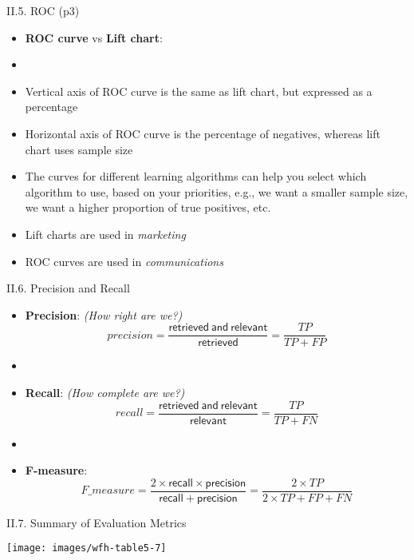 \documentclass[handout]{beamer}
\newcommand{\stronger}[1]{\textbf{\color{purple} #1}}
\begin{document}
\begin{frame}{II.5. ROC (p3)}
\begin{itemize}
\item \stronger{ROC curve} vs \stronger{Lift chart}:
\item[]
\item Vertical axis of ROC curve is the same as lift chart, but expressed as a percentage
\item Horizontal axis of ROC curve is the percentage of negatives, whereas lift chart uses sample size
\item The curves for different learning algorithms can help you select which algorithm to use, based on your priorities, e.g., we want a smaller sample size, we want a higher proportion of true positives, etc.
\item Lift charts are used in \emph{marketing}
\item ROC curves are used in \emph{communications}
\end{itemize}
\end{frame}
\begin{frame}{II.6. Precision and Recall}
\begin{itemize}
\item \stronger{Precision}: \emph{(How right are we?)}
\[
\mathit{precision} = \frac{ \mathsf{retrieved~and~relevant} }{ \mathsf{retrieved}} = \frac{ TP }{ TP + FP }
\]
\item[]
\item \stronger{Recall}: \emph{(How complete are we?)}
\[
\mathit{recall} = \frac{ \mathsf{retrieved~and~relevant} }{ \mathsf{relevant}} = \frac{ TP }{ TP + FN }
\]
\item[]
\item \stronger{F-measure}:
\[
\mathit{F\_measure} = \frac{ 2 \times \mathsf{recall} \times \mathsf{precision} }{ \mathsf{recall} + \mathsf{precision} } = \frac{ 2 \times TP }{ 2 \times TP + FP + FN }
\]
\end{itemize}
\end{frame}
\begin{frame}{II.7. Summary of Evaluation Metrics}
\begin{center}
\texttt{[image: images/wfh-table5-7]}\\
\cite[Table 5.7]{WFH3:2011}
\end{center}
\end{frame}
\end{document}
